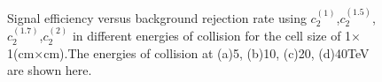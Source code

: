 \documentclass[final,1p,11pt]{elsarticle}
\begin{document}
\begin{figure}
\begin{center}

\end{center}
\caption{Signal efficiency versus background rejection rate using $c_2^{(1)}$,$c_2^{(1.5)}$,$c_2^{(1.7)}$,$c_2^{(2)}$ in different energies of collision for the cell size of  1$\times$1(cm$\times$cm).The energies of collision at (a)5, (b)10, (c)20, (d)40TeV are shown here.}
\label{cluster_r012_c_variable}
\end{figure}
\end{document}
